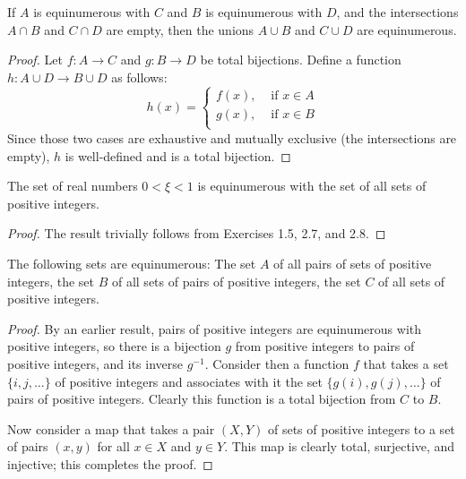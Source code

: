 \begin{exercise}[2.8]
  If $A$ is equinumerous with $C$ and $B$ is equinumerous with $D$, and the intersections $A \cap B$ and $C \cap D$ are empty, then the unions $A \cup B$ and $C \cup D$ are equinumerous.
\end{exercise}
\begin{proof}
  Let $f\colon A \to C$ and $g\colon B \to D$ be total bijections.
  Define a function $h\colon A \cup D \to B \cup D$ as follows:
  \begin{equation*}
    h(x) = \begin{cases}
      f(x), &\text{ if }x \in A\\
      g(x), &\text{ if }x \in B\\
    \end{cases}
  \end{equation*}
  Since those two cases are exhaustive and mutually exclusive (the intersections are empty), $h$ is well-defined and is a total bijection.
\end{proof}

\begin{exercise}[2.9]
  The set of real numbers $0 < \xi < 1$ is equinumerous with the set of all sets of positive integers.
\end{exercise}
\begin{proof}
  The result trivially follows from Exercises 1.5, 2.7, and 2.8.
\end{proof}

\begin{exercise}[2.10]
  The following sets are equinumerous: The set $A$ of all pairs of sets of positive integers, the set $B$ of all sets of pairs of positive integers, the set $C$ of all sets of positive integers.
\end{exercise}
\begin{proof}
  By an earlier result, pairs of positive integers are equinumerous with positive integers, so there is a bijection $g$ from positive integers to pairs of positive integers, and its inverse $g^{-1}$.
  Consider then a function $f$ that takes a set $\{i,j,\ldots\}$ of positive integers and associates with it the set $\{g(i), g(j), \ldots\}$ of pairs of positive integers.
  Clearly this function is a total bijection from $C$ to $B$.

  Now consider a map that takes a pair $(X,Y)$ of sets of positive integers to a set of pairs $(x,y)$ for all $x \in X$ and $y \in Y$.
  This map is clearly total, surjective, and injective; this completes the proof.
\end{proof}

